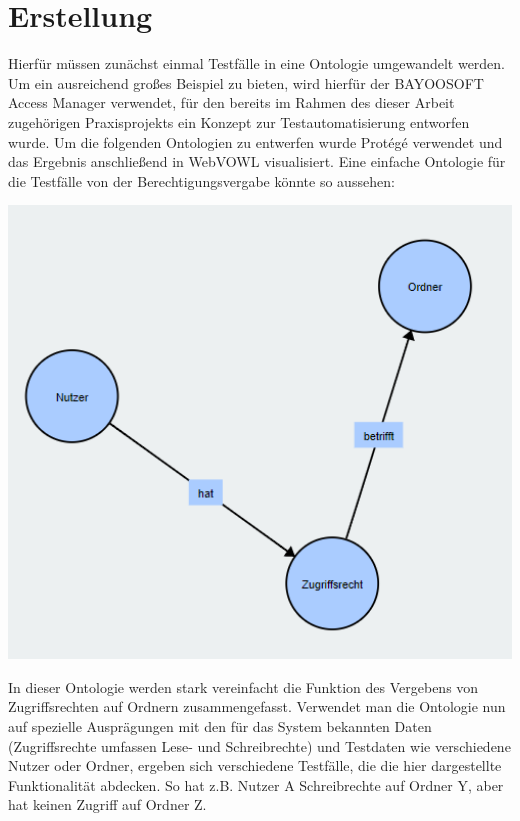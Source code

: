 \section{Erstellung}
Hierfür müssen zunächst einmal Testfälle in eine Ontologie umgewandelt werden. Um ein ausreichend großes Beispiel zu bieten, wird hierfür der BAYOOSOFT Access Manager verwendet, für den bereits im Rahmen des dieser Arbeit zugehörigen Praxisprojekts ein Konzept zur Testautomatisierung entworfen wurde. Um die folgenden Ontologien zu entwerfen wurde Protégé verwendet und das Ergebnis anschließend in WebVOWL visualisiert. \newline
Eine einfache Ontologie für die Testfälle von der Berechtigungsvergabe könnte so aussehen:\\

\begin{center}
    \includegraphics[width=1\textwidth]{Thesis/Images/OntologySmall.png}        
\end{center}

In dieser Ontologie werden stark vereinfacht die Funktion des Vergebens von Zugriffsrechten auf Ordnern zusammengefasst. Verwendet man die Ontologie nun auf spezielle Ausprägungen mit den für das System bekannten Daten (Zugriffsrechte umfassen Lese- und Schreibrechte) und Testdaten wie verschiedene Nutzer oder Ordner, ergeben sich verschiedene Testfälle, die die hier dargestellte Funktionalität abdecken. So hat z.B. Nutzer A Schreibrechte auf Ordner Y, aber hat keinen Zugriff auf Ordner Z. \\

